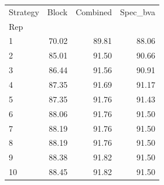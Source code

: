 \begin{tabular}{lrrr}
\toprule
Strategy & Block & Combined & Spec\_bva \\
Rep &  &  &  \\
\midrule
1 & 70.02 & 89.81 & 88.06 \\
2 & 85.01 & 91.50 & 90.66 \\
3 & 86.44 & 91.56 & 90.91 \\
4 & 87.35 & 91.69 & 91.17 \\
5 & 87.35 & 91.76 & 91.43 \\
6 & 88.06 & 91.76 & 91.50 \\
7 & 88.19 & 91.76 & 91.50 \\
8 & 88.19 & 91.76 & 91.50 \\
9 & 88.38 & 91.82 & 91.50 \\
10 & 88.45 & 91.82 & 91.50 \\
\bottomrule
\end{tabular}
